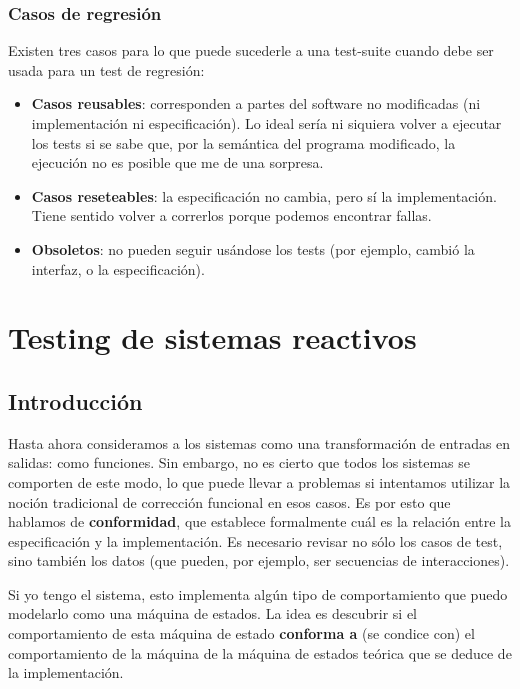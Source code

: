 \documentclass[]{article}
\begin{document}
\subsubsection{Casos de regresión}
Existen tres casos para lo que puede sucederle a una test-suite cuando debe ser usada para un test de regresión:
\begin{itemize}
	\item \textbf{Casos reusables}: corresponden a partes del software no modificadas (ni implementación ni especificación). Lo ideal sería ni siquiera volver a ejecutar los tests si se sabe que, por la semántica del programa modificado, la ejecución no es posible que me de una sorpresa.
	\item \textbf{Casos reseteables}: la especificación no cambia, pero sí la implementación. Tiene sentido volver a correrlos porque podemos encontrar fallas.
	\item \textbf{Obsoletos}: no pueden seguir usándose los tests (por ejemplo, cambió la interfaz, o la especificación).
\end{itemize}

%
%
%
%
%
%
%
%
%
%
%
%
%
%
%
%
%
%
%
%
%
%
%
%
%
%
%
%
%
%
\newpage

\section{Testing de sistemas reactivos}
\subsection{Introducción}
Hasta ahora consideramos a los sistemas como una transformación de entradas en salidas: como funciones. Sin embargo, no es cierto que todos los sistemas se comporten de este modo, lo que puede llevar a problemas si intentamos utilizar la noción tradicional de corrección funcional en esos casos. Es por esto que hablamos de \textbf{conformidad}, que establece formalmente cuál es la relación entre la especificación y la implementación. Es necesario revisar no sólo los casos de test, sino también los datos (que pueden, por ejemplo, ser secuencias de interacciones).

Si yo tengo el sistema, esto implementa algún tipo de comportamiento que puedo modelarlo como una máquina de estados. La idea es descubrir si el comportamiento de esta máquina de estado \textbf{conforma a} (se condice con) el comportamiento de la máquina de la máquina de estados teórica que se deduce de la implementación.
\end{document}
